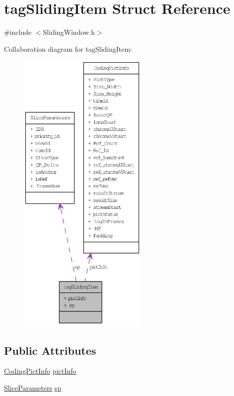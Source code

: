 \hypertarget{structtag_sliding_item}{
\section{tagSlidingItem Struct Reference}
\label{structtag_sliding_item}
}


{\ttfamily \#include $<$SlidingWindow.h$>$}



Collaboration diagram for tagSlidingItem:\nopagebreak
\begin{figure}[H]
\begin{center}
\leavevmode
\includegraphics[height=400pt]{structtag_sliding_item__coll__graph}
\end{center}
\end{figure}
\subsection*{Public Attributes}
\begin{DoxyCompactItemize}
\item 
\hyperlink{struct_coding_pict_info}{CodingPictInfo} \hyperlink{structtag_sliding_item_a3d1f87274664505c5fb9fe06d3cd16d3}{pictInfo}
\item 
\hyperlink{struct_slice_parameters}{SliceParameters} \hyperlink{structtag_sliding_item_a56c9f0817a904f6257d5de4e28c28724}{sp}
\end{DoxyCompactItemize}


